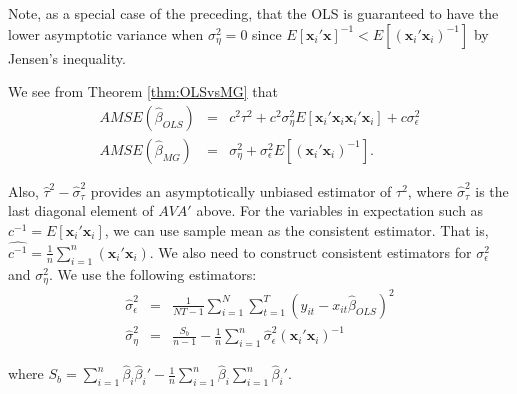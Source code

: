 Note, as a special case of the preceding, that the OLS is guaranteed to have the lower asymptotic variance when $\sigma_{\eta}^2 = 0$ since $E[\mathbf{x}_i'\mathbf{x}]^{-1} < E[(\mathbf{x}_i'\mathbf{x}_i)^{-1}]$ by Jensen's inequality.

We see from Theorem \ref{thm:OLSvsMG} that 
\begin{eqnarray}
  AMSE(\widehat{\beta}_{OLS}) &=& c^2 \tau^2 + c^2 \sigma_\eta^2 E[\mathbf{x}_i'\mathbf{x}_i \mathbf{x}_i' \mathbf{x}_i] +  c \sigma_\epsilon^2   \\
  \label{eq:OLSAMSE}
  AMSE(\widehat{\beta}_{MG}) &=& \sigma_\eta^2    + \sigma_\epsilon^2 E[(\mathbf{x}_i'\mathbf{x}_i)^{-1}]
  \label{eq:MGAMSE}.
\end{eqnarray}

Also, $\widehat{\tau}^2 - \widehat{\sigma}_\tau^2$ provides an asymptotically unbiased estimator of $\tau^2$, where $\widehat{\sigma}_\tau^2$ is the last diagonal element of $AVA'$ above. 
For the variables in expectation such as $c^{-1} = E[\mathbf{x}_i'\mathbf{x}_i]$, we can use sample mean as the consistent estimator. That is, $\widehat{c^{-1}} =  \frac{1}{n} \sum_{i=1}^n (\mathbf{x}_i'\mathbf{x}_i) $. We also need to construct consistent estimators for $\sigma_\epsilon^2$ and $\sigma_\eta^2$. We use the following estimators:
\begin{eqnarray}
\widehat{\sigma}_\epsilon^2 &=& \frac{1}{NT - 1} \sum_{i=1}^N \sum_{t=1}^T (y_{it}-x_{it}\widehat{\beta}_{OLS})^2\\
\widehat{\sigma}_\eta^2 &=& \frac{S_b}{n-1} -\frac{1}{n} \sum_{i=1}^n \widehat{\sigma}_\epsilon^2 (\mathbf{x}_i'\mathbf{x}_i)^{-1} 
\end{eqnarray}

where $S_b = \sum_{i=1}^n \widehat{\beta}_i \widehat{\beta}_i' - \frac{1}{n} \sum_{i=1}^n \widehat{\beta}_i \sum_{i=1}^n \widehat{\beta}_i'$. 

